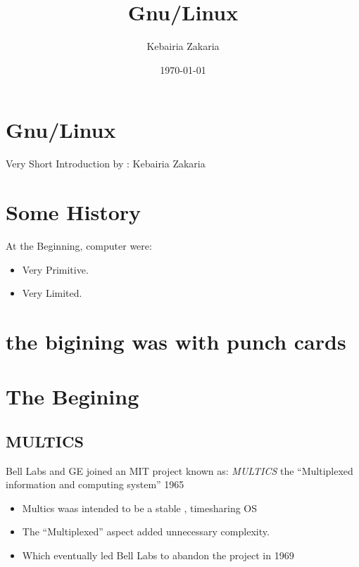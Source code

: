 \documentclass[11pt]{article}
\author{Kebairia Zakaria}
\date{\today}
\title{Gnu/Linux}
\begin{document}
\maketitle
\section*{Gnu/Linux}
\label{sec:orgf5ec4cc}
Very Short Introduction
by : Kebairia Zakaria
\section*{Some History}
\label{sec:org5e0d6b8}
At the Beginning, computer were:
\begin{itemize}
\item Very Primitive.
\end{itemize}
\begin{itemize}
\item Very Limited.
\end{itemize}
\section*{the bigining was with punch cards}
\label{sec:org0d87c1d}
\section*{}
\label{sec:orgaa6b25d}
\section*{The Begining}
\label{sec:org71fa44c}
\subsection*{MULTICS}
\label{sec:orgfeec677}
Bell Labs and GE joined an MIT project known as:
\emph{MULTICS} the “Multiplexed information and computing system” 1965
\begin{itemize}
\item Multics waas intended to be a stable , timesharing OS
\end{itemize}
\begin{itemize}
\item The “Multiplexed” aspect added unnecessary complexity.
\end{itemize}
\begin{itemize}
\item Which eventually led Bell Labs to abandon the project in 1969
\end{itemize}
\subsection*{}
\label{sec:orge1a0a4a}
\end{document}
